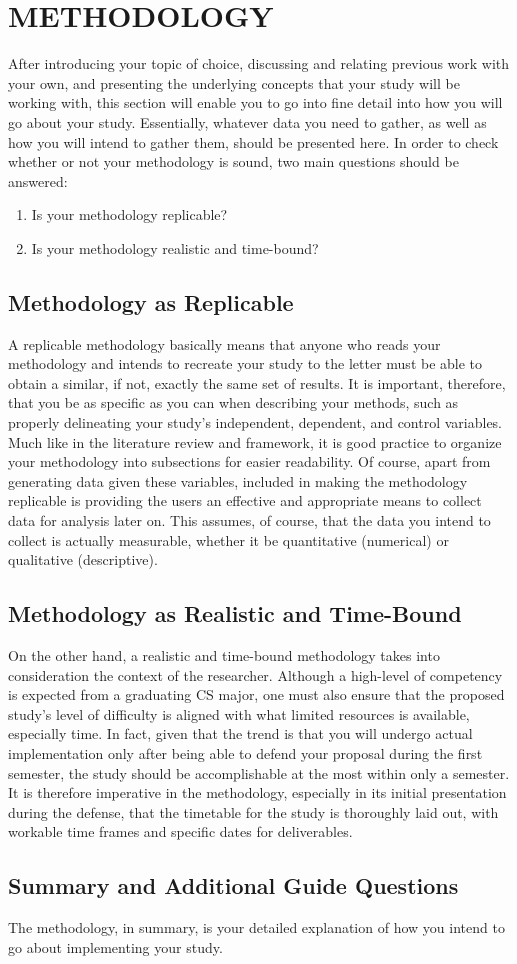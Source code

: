 \chapter{METHODOLOGY}

After introducing your topic of choice, discussing and relating previous work with your own, and presenting the underlying concepts that your study will be working with, this section will enable you to go into fine detail into how you will go about your study. Essentially, whatever data you need to gather, as well as how you will intend to gather them, should be presented here.
In order to check whether or not your methodology is sound, two main questions should be answered:
\begin{enumerate}
	\item Is your methodology replicable?
	\item Is your methodology realistic and time-bound?
\end{enumerate}

\section{Methodology as Replicable}
A replicable methodology basically means that anyone who reads your methodology and intends to recreate your study to the letter must be able to obtain a similar, if not, exactly the same set of results. It is important, therefore, that you be as specific as you can when describing your methods, such as properly delineating your study’s independent, dependent, and control variables. Much like in the literature review and framework, it is good practice to organize your methodology into subsections for easier readability. Of course, apart from generating data given these variables, included in making the methodology replicable is providing the users an effective and appropriate means to collect data for analysis later on. This assumes, of course, that the data you intend to collect is actually measurable, whether it be quantitative (numerical) or qualitative (descriptive).

\section{Methodology as Realistic and Time-Bound}
On the other hand, a realistic and time-bound methodology takes into consideration the context of the researcher. Although a high-level of competency is expected from a graduating CS major, one must also ensure that the proposed study’s level of difficulty is aligned with what limited resources is available, especially time. In fact, given that the trend is that you will undergo actual implementation only after being able to defend your proposal during the first semester, the study should be accomplishable at the most within only a semester. It is therefore imperative in the methodology, especially in its initial presentation during the defense, that the timetable for the study is thoroughly laid out, with workable time frames and specific dates for deliverables.

\section{Summary and Additional Guide Questions}
The methodology, in summary, is your detailed explanation of how you intend to go about implementing your study.